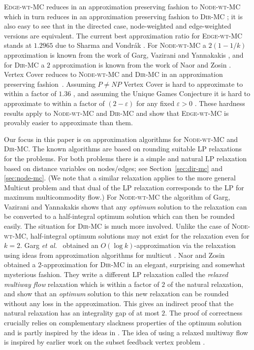 \documentclass[11pt]{article}
\newcommand{\etal}{{\em et al.}~}
\def\eps{\varepsilon}
\def\MC{\textsc{Edge-wt-MC}\xspace}
\def\DirMC{\textsc{Dir-MC}\xspace}
\def\NodeMC{\textsc{Node-wt-MC}\xspace}
\def\NodeMC{\textsc{Node-wt-MC}\xspace}
\begin{document}
\MC reduces in an approximation preserving fashion to \NodeMC which in
turn reduces in an approximation preserving fashion to \DirMC
\cite{GargVY04}; it is also easy to see that in the directed case,
node-weighted and edge-weighted versions are equivalent. The current
best approximation ratio for \MC stands at $1.2965$ due to Sharma and
Vondr\'ak \cite{SharmaV14}. For \NodeMC a $2(1-1/k)$ approximation is
known from the work of Garg, Vazirani and Yannakakis \cite{GargVY04},
and for \DirMC a $2$ approximation is known from the work of Naor and
Zosin \cite{NaorZ01}.  {\sc Vertex Cover} reduces to \NodeMC and
\DirMC in an approximation preserving
fashion~\cite{GargVY04}. Assuming $P \neq NP$ {\sc Vertex Cover} is
hard to approximate to within a factor of $1.36$ \cite{DinurS05}, and
assuming the Unique Games Conjecture it is hard to approximate to
within a factor of $(2-\eps)$ for any fixed $\eps > 0$
\cite{KhotR08}. These hardness results apply to \NodeMC and \DirMC and
show that \MC is provably easier to approximate than them.

Our focus in this paper is on approximation algorithms for \NodeMC and
\DirMC. The known algorithms are based on rounding suitable LP
relaxations for the problems. For both problems there is a simple and
natural LP relaxation based on distance variables on nodes/edges; see
Section~\ref{sec:dir-mc} and \ref{sec:node-mc}. (We note that a
similar relaxation applies to the more general {\sc Multicut} problem
and that dual of the LP relaxation corresponds to the LP for maximum
multicommodity flow.)  \iffalse In fact the approximation bounds of
$2(1-1/k)$ and $2$ also establish the same upper bounds on the
integrality gap of this natural relaxation.  However, the rounding
schemes are far from trivial.  \fi For \NodeMC the algorithm of Garg,
Vazirani and Yannakakis \cite{GargVY04} shows that any {\em optimum}
solution to the relaxation can be converted to a half-integral optimum
solution which can then be rounded easily.  The situation for \DirMC
is much more involved. Unlike the case of \NodeMC, half-integral
optimum solutions may not exist for the relaxation even for $k=2$.
Garg \etal \cite{GargVY94} obtained an $O(\log k)$-approximation via
the relaxation using ideas from approximation algorithms for multicut
\cite{GVY}.  Naor and Zosin obtained a $2$-approximation for \DirMC in
an elegant, surprising and somewhat mysterious fashion. They write a
different LP relaxation called the {\em relaxed multiway flow}
relaxation which is within a factor of $2$ of the natural relaxation,
and show that an {\em optimum} solution to this new relaxation can be
rounded without any loss in the approximation. This gives an indirect
proof that the natural relaxation has an integrality gap of at most
$2$. The proof of correctness crucially relies on complementary
slackness properties of the optimum solution and is partly inspired by
the ideas in \cite{GargVY04}. The idea of using a relaxed multiway
flow is inspired by earlier work on the subset feedback vertex problem
\cite{EvenNZ00}.
\end{document}
